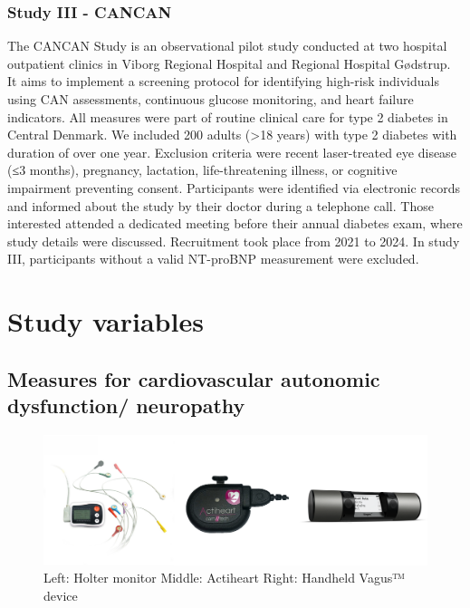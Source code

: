 \documentclass[
  a4paper,
  headsepline=true,
  open=any]{scrbook}
\begin{document}
\hypertarget{study-iii---cancan}{%
\subsubsection{Study III - CANCAN}\label{study-iii---cancan}}

The CANCAN Study is an observational pilot study conducted at two
hospital outpatient clinics in Viborg Regional Hospital and Regional
Hospital Gødstrup. It aims to implement a screening protocol for
identifying high-risk individuals using CAN assessments, continuous
glucose monitoring, and heart failure indicators. All measures were part
of routine clinical care for type 2 diabetes in Central Denmark. We
included 200 adults (\textgreater18 years) with type 2 diabetes with
duration of over one year. Exclusion criteria were recent laser-treated
eye disease (≤3 months), pregnancy, lactation, life-threatening illness,
or cognitive impairment preventing consent. Participants were identified
via electronic records and informed about the study by their doctor
during a telephone call. Those interested attended a dedicated meeting
before their annual diabetes exam, where study details were discussed.
Recruitment took place from 2021 to 2024. In study III, participants
without a valid NT-proBNP measurement were excluded.

\hypertarget{study-variables}{%
\section{Study variables}\label{study-variables}}

\hypertarget{measures-for-cardiovascular-autonomic-dysfunction-neuropathy}{%
\subsection{Measures for cardiovascular autonomic dysfunction/
neuropathy}\label{measures-for-cardiovascular-autonomic-dysfunction-neuropathy}}

\begin{figure}

{\centering \includegraphics[width=5in,height=\textheight]{images/can_tools.pdf}

}

\caption{Left: Holter monitor Middle: Actiheart Right: Handheld Vagus™
device}

\end{figure}
\end{document}
